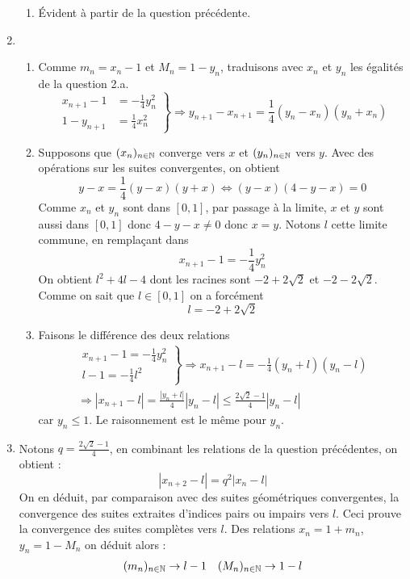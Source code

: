 \begin{enumerate}
\begin{enumerate}
\item \'Evident à partir de la question précédente.
\end{enumerate}
\item \begin{enumerate}
 \item Comme $m_n=x_n-1$ et $M_n=1-y_n$, traduisons avec $x_n$ et $y_n$ les égalités de la question 2.a.
\begin{displaymath}
\left.
\begin{aligned}
 x_{n+1}-1&=-\frac{1}{4}y_n^2 \\
1-y_{n+1}&=\frac{1}{4}x_n^2  
\end{aligned}
\right\rbrace 
\Rightarrow
y_{n+1}-x_{n+1}=\frac{1}{4}(y_n-x_n)(y_n+x_n)
\end{displaymath}
\item Supposons que $(x_n)_{n\in\mathbb{N}}$ converge vers $x$ et $(y_n)_{n\in\mathbb{N}}$ vers $y$. Avec des opérations sur les suites convergentes, on obtient
\begin{displaymath}
 y-x=\frac{1}{4}(y-x)(y+x) \Leftrightarrow
(y-x)(4-y-x)=0
\end{displaymath}
Comme $x_n$ et $y_n$ sont dans $[0,1]$, par passage à la limite, $x$ et $y$ sont aussi dans $[0,1]$ donc $4-y-x\neq0$ donc $x=y$.\newline
Notons $l$ cette limite commune, en remplaçant dans 
\begin{displaymath}
 x_{n+1}-1=-\frac{1}{4}y_n^2
\end{displaymath}
On obtient $ l^2+4l-4$ dont les racines sont $-2+2\sqrt{2}$ et $-2-2\sqrt{2}$. Comme on sait que $l\in [0,1]$ on a forcément
\begin{displaymath}
 l=-2+2\sqrt{2}
\end{displaymath}
\item Faisons le différence des deux relations 
\begin{multline*}
\left. 
\begin{aligned}
 x_{n+1}-1 = -\frac{1}{4}y_n^2 \\
 l-1 = -\frac{1}{4}l^2  
\end{aligned}
\right\rbrace 
\Rightarrow
 x_{n+1}-l=-\frac{1}{4}(y_n+l)(y_n-l) \\
 \Rightarrow|x_{n+1}-l|=\frac{|y_n+l|}{4}|y_n-l| 
\leq\frac{2\sqrt{2}-1}{4}|y_n-l|
\end{multline*}
car $y_n\leq 1$. Le raisonnement est le même pour $y_n$.
\end{enumerate}
\item Notons $q=\frac{2\sqrt{2}-1}{4}$, en combinant les relations de la question précédentes, on obtient :
\begin{displaymath}
|x_{n+2}-l|=q^2|x_n-l|
\end{displaymath}
On en déduit, par comparaison avec des suites géométriques convergentes, la convergence des suites extraites d'indices pairs ou impairs vers $l$. Ceci prouve la convergence des suites complètes vers $l$.
 Des relations $x_n = 1 + m_n$, $y_n = 1-M_n$  on déduit alors :
\begin{align*}
 (m_n)_{n\in\mathbb{N}}\rightarrow l-1 & & (M_n)_{n\in\mathbb{N}}\rightarrow 1-l
\end{align*}
\end{enumerate}


